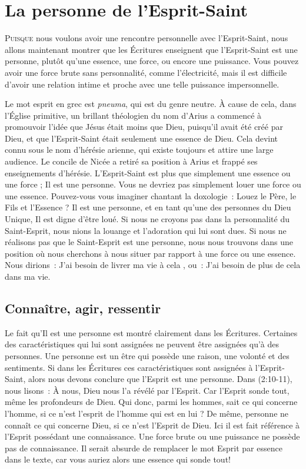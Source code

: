 \chapter{La personne de l'Esprit-Saint}

\lettrine{P}{uisque} nous voulons avoir une rencontre personnelle avec \linebreak
 l'Esprit-Saint, nous allons maintenant montrer que les Écritures enseignent
 que l'Esprit-Saint est une personne, plutôt qu'une essence, une force, ou
 encore une puissance. Vous pouvez avoir une force brute sans personnalité,
 comme l'électricité, mais il est difficile d'avoir une relation intime et
 proche avec une telle puissance impersonnelle.

Le mot \og esprit \fg{} en grec est \emph{pneuma}, qui est du genre neutre.
 À cause de cela, dans l'Église primitive, un brillant théologien du nom
 d'Arius a commencé à promouvoir l'idée que Jésus était moins que Dieu,
 puisqu'il avait été créé par Dieu, et que l'Esprit-Saint était seulement
 une \og essence \fg{} de Dieu. Cela devint connu sous le nom d'hérésie
 arienne, qui existe toujours et attire une large audience. Le concile de
 Nicée a retiré sa position à Arius et frappé ses enseignements d'hérésie.
 L'Esprit-Saint est plus que simplement une essence ou une force ; Il est
 une personne. Vous ne devriez pas simplement louer une force ou une essence.
 Pouvez-vous vous imaginer chantant la doxologie~:
 \og Louez le Père, le Fils et l'Essence \fg{} ?
 Il est une personne, et en tant qu'une des personnes
 du Dieu Unique, Il est digne d'être loué. Si nous ne croyons pas dans la
 personnalité du Saint-Esprit, nous nions la louange et l'adoration qui lui
 sont dues. Si nous ne réalisons pas que le Saint-Esprit est une personne,
 nous nous trouvons dans une position où nous cherchons à nous situer par
 rapport à une force ou une essence. Nous dirions~: \og J'ai besoin de livrer
 ma vie à cela \fg{}, ou~: \og J'ai besoin de plus de cela dans ma vie.\fg


\section{Connaître, agir, ressentir}

Le fait qu'Il est une personne est montré clairement dans les Écritures.
 Certaines des caractéristiques qui lui sont assignées ne peuvent être assignées
 qu'à des personnes. Une personne est un être qui possède une raison,
 une volonté et des sentiments.
 Si dans les Écritures ces caractéristiques sont assignées à
 l'Esprit-Saint, alors nous devons conclure que l'Esprit est une personne.
 Dans (2:10-11), nous lisons~: \og À nous, Dieu nous l'a
 révélé par l'Esprit. Car l'Esprit sonde tout, même les profondeurs de Dieu.
 Qui donc, parmi les hommes, sait ce qui concerne l'homme, si ce n'est
 l'esprit de l'homme qui est en lui ? De même, personne ne connaît ce qui
 concerne Dieu, si ce n'est l'Esprit de Dieu. \fg{} Ici il est fait référence
 à l'Esprit possédant une connaissance. Une force brute ou une puissance ne
 possède pas de connaissance. Il serait absurde de remplacer le mot
 \og Esprit \fg{} par \og essence \fg{} dans le texte, car vous auriez alors
 une \og essence \fg{} qui sonde tout!

